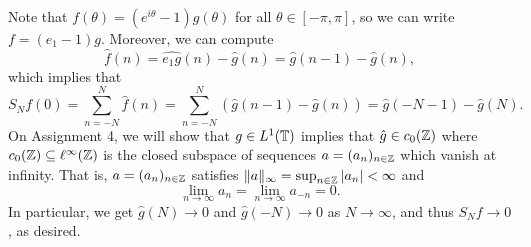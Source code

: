 \begin{pf}
    Note that $f(\theta) = (e^{i\theta} - 1)g(\theta)$ for all $\theta \in 
    [-\pi, \pi]$, so we can write $f = (e_1 - 1)g$. Moreover, we can compute 
    \[ \hat f(n) = \widehat{e_1g}(n) - \hat g(n) = \hat g(n-1) - \hat g(n), \] 
    which implies that 
    \[ S_N f(0) = \sum_{n=-N}^N \hat f(n) = 
    \sum_{n=-N}^N (\hat g(n-1) - \hat g(n)) = \hat g(-N-1) - \hat g(N). \] 
    On Assignment 4, we will show that $g \in L^1(\mathbb{T})$ implies that 
    $\hat g \in c_0(\mathbb{Z})$ where $c_0(\mathbb{Z}) \subseteq \ell^\infty(\mathbb{Z})$ is the 
    closed subspace of sequences $a = (a_n)_{n\in\mathbb{Z}}$ which vanish at infinity.
    That is, $a = (a_n)_{n\in\mathbb{Z}}$ satisfies $\|a\|_\infty = \sup_{n\in\mathbb{Z}} 
    |a_n| < \infty$ and 
    \[ \lim_{n\to\infty} a_n = \lim_{n\to\infty} a_{-n} = 0. \]  
    In particular, we get $\hat g(N) \to 0$ and $\hat g(-N) \to 0$ 
    as $N \to \infty$, and thus $S_N f \to 0$, as desired. 
\end{pf}

